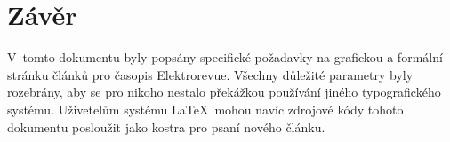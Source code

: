 \section{Závěr}
V~tomto dokumentu byly popsány specifické požadavky na grafickou a formální stránku článků pro časopis Elektrorevue. Všechny důležité parametry byly rozebrány, aby se pro nikoho nestalo překážkou používání jiného typografického systému. Uživetelům systému \LaTeX~mohou navíc zdrojové kódy tohoto dokumentu posloužit jako kostra pro psaní nového článku.
